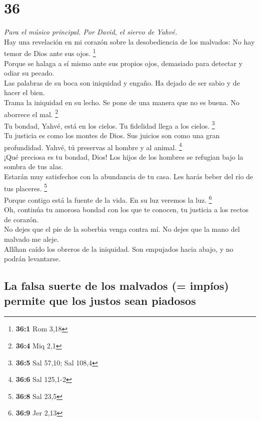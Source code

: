 \hypertarget{section-35}{%
\section{36}\label{section-35}}

\emph{Para el músico principal. Por David, el siervo de Yahvé.}\\
 Hay una revelación en mi corazón sobre la desobediencia
de los malvados: No hay temor de Dios ante sus ojos. \footnote{\textbf{36:1}
  Rom 3,18}\\
 Porque se halaga a sí mismo ante sus propios ojos,
demasiado para detectar y odiar su pecado.\\
 Las palabras de su boca son iniquidad y engaño. Ha dejado
de ser sabio y de hacer el bien.\\
 Trama la iniquidad en su lecho. Se pone de una manera que
no es buena. No aborrece el mal. \footnote{\textbf{36:4} Miq 2,1}\\
 Tu bondad, Yahvé, está en los cielos. Tu fidelidad llega
a los cielos. \footnote{\textbf{36:5} Sal 57,10; Sal 108,4}\\
 Tu justicia es como los montes de Dios. Sus juicios son
como una gran profundidad. Yahvé, tú preservas al hombre y al animal.
\footnote{\textbf{36:6} Sal 125,1-2}\\
 ¡Qué preciosa es tu bondad, Dios! Los hijos de los
hombres se refugian bajo la sombra de tus alas.\\
 Estarán muy satisfechos con la abundancia de tu casa. Les
harás beber del río de tus placeres. \footnote{\textbf{36:8} Sal 23,5}\\
 Porque contigo está la fuente de la vida. En su luz
veremos la luz. \footnote{\textbf{36:9} Jer 2,13}\\
 Oh, continúa tu amorosa bondad con los que te conocen,
tu justicia a los rectos de corazón.\\
 No dejes que el pie de la soberbia venga contra mí. No
dejes que la mano del malvado me aleje.\\
 Allíhan caído los obreros de la iniquidad. Son empujados
hacia abajo, y no podrán levantarse.

\hypertarget{la-falsa-suerte-de-los-malvados-impuxedos-permite-que-los-justos-sean-piadosos}{%
\subsection{La falsa suerte de los malvados (= impíos) permite que los
justos sean
piadosos}\label{la-falsa-suerte-de-los-malvados-impuxedos-permite-que-los-justos-sean-piadosos}}

